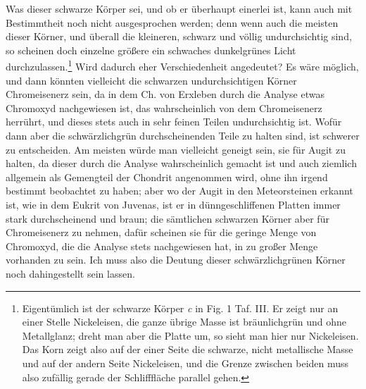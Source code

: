 \documentclass[a4paper, 11pt, oneside]{article}
\begin{document}
Was dieser schwarze Körper sei, und ob er überhaupt einerlei ist, kann auch mit Bestimmtheit noch nicht ausgesprochen werden; denn wenn auch die meisten dieser Körner, und überall die kleineren, schwarz und völlig undurchsichtig sind, so scheinen doch einzelne größere ein schwaches dunkelgrünes Licht durchzulassen.\footnote{Eigentümlich ist der schwarze Körper \emph{c} in Fig. 1 Taf. III. Er zeigt nur an einer Stelle Nickeleisen, die ganze übrige Masse ist bräunlichgrün und ohne Metallglanz; dreht man aber die Platte um, so sieht man hier nur Nickeleisen. Das Korn zeigt also auf der einer Seite die schwarze, nicht metallische Masse und auf der andern Seite Nickeleisen, und die Grenze zwischen beiden muss also zufällig gerade der Schlifffläche parallel gehen.} Wird dadurch eher Verschiedenheit angedeutet? Es wäre möglich, und dann könnten vielleicht die schwarzen undurchsichtigen Körner Chromeisenerz sein, da in dem Ch. von Erxleben durch die Analyse etwas Chromoxyd nachgewiesen ist, das wahrscheinlich von dem Chromeisenerz herrührt, und dieses stets auch in sehr feinen Teilen undurchsichtig ist. Wofür dann aber die schwärzlichgrün durchscheinenden Teile zu halten sind, ist schwerer zu entscheiden. Am meisten würde man vielleicht geneigt sein, sie für Augit zu halten, da dieser durch die Analyse wahrscheinlich gemacht ist und auch ziemlich allgemein als Gemengteil der Chondrit angenommen wird, ohne ihn irgend bestimmt beobachtet zu haben; aber wo der Augit in den Meteorsteinen erkannt ist, wie in dem Eukrit von Juvenas, ist er in dünngeschliffenen Platten immer stark durchscheinend und braun; die sämtlichen schwarzen Körner aber für Chromeisenerz zu nehmen, dafür scheinen sie für die geringe Menge von Chromoxyd, die die Analyse stets nachgewiesen hat, in zu großer Menge vorhanden zu sein. Ich muss also die Deutung dieser schwärzlichgrünen Körner noch dahingestellt sein lassen.
\end{document}
